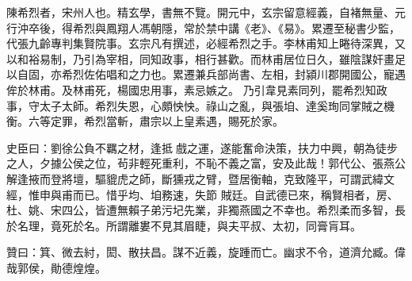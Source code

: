 \begin{pinyinscope}
 陳希烈者，宋州人也。精玄學，書無不覽。開元中，玄宗留意經義，自褚無量、元行沖卒後，得希烈與鳳翔人馮朝隱，常於禁中講《老》、《易》。累遷至秘書少監，代張九齡專判集賢院事。玄宗凡有撰述，必經希烈之手。李林甫知上睠待深異，又以和裕易制，乃引為宰相，同知政事，相行甚歡。而林甫居位日久，雖陰謀奸畫足以自固，亦希烈佐佑唱和之力也。累遷兼兵部尚書、左相，封潁川郡開國公，寵遇侔於林甫。及林甫死，楊國忠用事，素忌嫉之。
 乃引韋見素同列，罷希烈知政事，守太子太師。希烈失恩，心頗怏怏。祿山之亂，與張垍、達奚珣同掌賊之機衡。六等定罪，希烈當斬，肅宗以上皇素遇，賜死於家。



 史臣曰：劉徐公負不羈之材，逢抵戲之運，遂能奮命決策，扶力中興，朝為徒步之人，夕據公侯之位，茍非輕死重利，不恥不義之富，安及此哉！郭代公、張燕公解逢掖而登將壇，驅貔虎之師，斷獯戎之臂，暨居衡軸，克致隆平，可謂武緯文經，惟申與甫而已。惜乎均、垍務速，失節
 賊廷。自武德已來，稱賢相者，房、杜、姚、宋四公，皆遭無賴子弟污圮先業，非獨燕國之不幸也。希烈柔而多智，長於名理，竟死於名。所謂離婁不見其眉睫，與夫平叔、太初，同膏肓耳。



 贊曰：箕、微去紂，閎、散扶昌。謀不近義，旋踵而亡。幽求不令，道濟允臧。偉哉郭侯，勛德煌煌。



\end{pinyinscope}